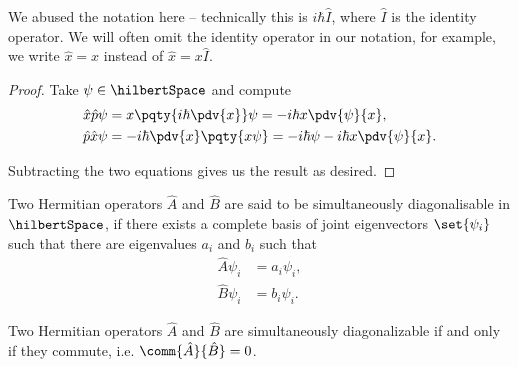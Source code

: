 \begin{remark}
    We abused the notation here -- technically this is \(i \hbar \hat{I}\), where \(\hat{I}\) is the identity operator. We will often omit the identity operator in our notation, for example, we write \(\hat{x} = x\) instead of \(\hat{x} = x \hat{I}\).
\end{remark}

\begin{proof}
    Take \(\psi \in \hilbertSpace\) and compute
    \begin{subequations}
        \begin{align}
            \hat{x} \hat{p} \psi &= x \pqty{i \hbar \pdv{x}} \psi = - i \hbar x \pdv{\psi}{x}, \\
            \hat{p} \hat{x} \psi &= - i \hbar \pdv{x} \pqty{x \psi} = - i \hbar \psi - i \hbar x \pdv{\psi}{x}.
        \end{align}
    \end{subequations}

    Subtracting the two equations gives us the result as desired.
\end{proof}

\begin{definition}
    Two Hermitian operators \(\hat{A}\) and \(\hat{B}\) are said to be simultaneously diagonalisable in \(\hilbertSpace\), if there exists a complete basis of joint eigenvectors \(\set{\psi_i}\) such that there are eigenvalues \(a_i\) and \(b_i\) such that
    \begin{subequations}
        \begin{align}
            \hat{A} \psi_i &= a_i \psi_i, \\
            \hat{B} \psi_i &= b_i \psi_i.
        \end{align}
    \end{subequations}
\end{definition}

\begin{theorem}
    Two Hermitian operators \(\hat{A}\) and \(\hat{B}\) are simultaneously diagonalizable if and only if they commute, i.e. \(\comm{\hat{A}}{\hat{B}} = 0\).
\end{theorem}

